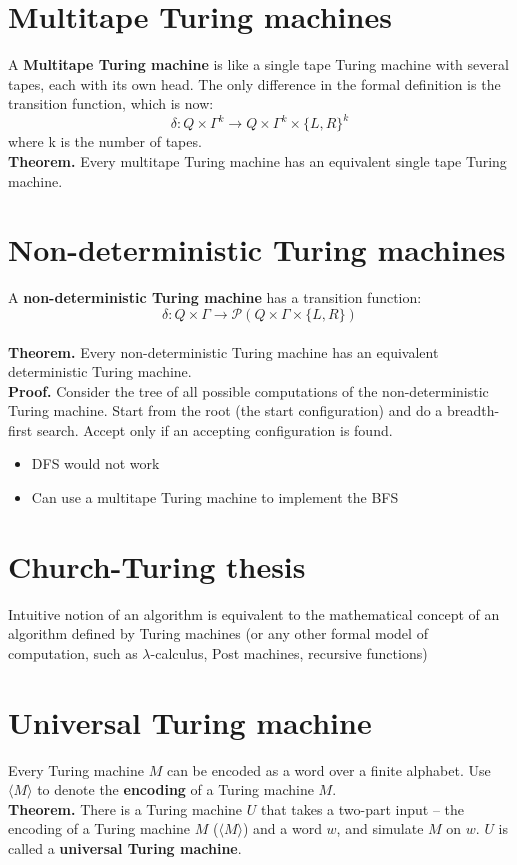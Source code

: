 \documentclass{article}
\begin{document}
\section{Multitape Turing machines}
A \textbf{Multitape Turing machine} is like a single tape Turing machine with several tapes, each with its own head. The only difference in the formal definition is the transition function, which is now:
$$\delta: Q \times \Gamma^k \rightarrow Q \times \Gamma^k \times \{L, R\}^k$$
where k is the number of tapes.\medskip
\\\textbf{Theorem.} Every multitape Turing machine has an equivalent single tape Turing machine.

\section{Non-deterministic Turing machines}
A \textbf{non-deterministic Turing machine} has a transition function:
$$\delta: Q \times \Gamma \rightarrow \mathcal{P}(Q \times \Gamma \times \{L, R\})$$
\\\textbf{Theorem.} Every non-deterministic Turing machine has an equivalent deterministic Turing machine.
\\\textbf{Proof.} Consider the tree of all possible computations of the non-deterministic Turing machine. Start from the root (the start configuration) and do a breadth-first search. Accept only if an accepting configuration is found.
\begin{itemize}
	\item{DFS would not work}
	\item{Can use a multitape Turing machine to implement the BFS}
\end{itemize}

\section{Church-Turing thesis}
Intuitive notion of an algorithm is equivalent to the mathematical concept of an algorithm defined by Turing machines (or any other formal model of computation, such as $\lambda$-calculus, Post machines, recursive functions)

\section{Universal Turing machine}
Every Turing machine $M$ can be encoded as a word over a finite alphabet. Use $\langle M\rangle$ to denote the \textbf{encoding} of a Turing machine $M$.\medskip
\\\textbf{Theorem.} There is a Turing machine $U$ that takes a two-part input -- the encoding of a Turing machine $M$ ($\langle M \rangle$) and a word $w$, and simulate $M$ on $w$. $U$ is called a \textbf{universal Turing machine}.
\end{document}
